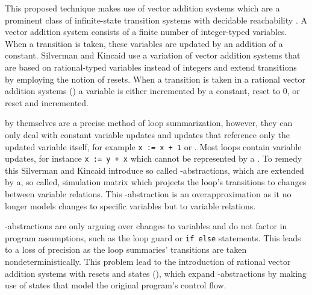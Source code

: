 This proposed technique makes use of vector addition systems which are a prominent class of infinite-state transition systems with decidable reachability \cite{DBLP:conf/rp/HaaseH14}. A vector addition system consists of a finite number of integer-typed variables. When a transition is taken, these variables are updated by an addition of a constant. Silverman and Kincaid use a variation of vector addition systems that are based on rational-typed variables instead of integers and extend transitions by employing the notion of resets. When a transition is taken in a rational vector addition systems (\qvasr) a variable is either incremented by a constant, reset to 0, or reset and incremented.\\ \par

\qvasr by themselves are a precise method of loop summarization, however, they can only deal with constant variable updates and updates that reference only the updated variable itself, for example \texttt{x := x + 1} or . Most loops contain variable updates, for instance \texttt{x := y + x} which cannot be represented by a \qvasr. To remedy this Silverman and Kincaid introduce so called \qvasr-abstractions, which are \qvasr extended by a, so called, simulation matrix which projects the loop's transitions to changes between variable relations. This \qvasr-abstraction is an overapproximation as it no longer models changes to specific variables but to variable relations.\\ \par

\qvasr-abstractions are only arguing over changes to variables and do not factor in program assumptions, such as the loop guard or \texttt{if else} statements. This leads to a loss of precision as the loop summaries' transitions are taken nondeterministically. This problem lead to the introduction of rational vector addition systems with resets and states (\qvasr), which expand \qvasr-abstractions by making use of states that model the original program's control flow.\\ \par


